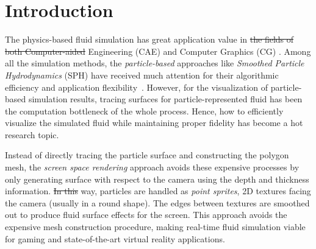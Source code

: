 \documentclass[times,twocolumn,final]{elsarticle}
\providecommand{\DIFaddtex}[1]{{\protect\color{blue}\uwave{#1}}} %
\providecommand{\DIFdeltex}[1]{{\protect\color{red}\sout{#1}}}                      %
\providecommand{\DIFaddbegin}{} %
\providecommand{\DIFaddend}{} %
\providecommand{\DIFdelbegin}{} %
\providecommand{\DIFdelend}{} %
\providecommand{\DIFadd}[1]{\texorpdfstring{\DIFaddtex{#1}}{#1}} %
\providecommand{\DIFdel}[1]{\texorpdfstring{\DIFdeltex{#1}}{}} %
\begin{document}
\linenumbers

\section{Introduction}
\label{sec1}
\DIFaddbegin 


\DIFaddend The physics-based fluid simulation has great application value in \DIFdelbegin \DIFdel{the fields of both Computer-aided }\DIFdelend \DIFaddbegin \DIFadd{computer-aided }\DIFaddend Engineering (CAE) and Computer Graphics (CG) \DIFaddbegin \DIFadd{fields}\DIFaddend .
Among all the simulation methods, the \emph{particle-based} approaches like \emph{Smoothed Particle Hydrodynamics} (SPH) have received much attention for their algorithmic efficiency and application flexibility~\cite{Ihmsen14}. 
However, for the visualization of particle-based simulation results, tracing surfaces for particle-represented fluid has been the computation bottleneck of the whole process. Hence, how to efficiently visualize the simulated fluid while maintaining proper fidelity has become a hot research topic.

Instead of directly tracing the particle surface and constructing the polygon mesh, the \emph{screen space rendering} approach avoids these expensive processes by only generating \DIFaddbegin \DIFadd{the }\DIFaddend surface with respect to the camera using the depth and thickness information. \DIFdelbegin \DIFdel{In this }\DIFdelend \DIFaddbegin \DIFadd{This }\DIFaddend way, particles are handled as \emph{point sprites}, 2D textures facing the camera (usually in a round shape). The edges between textures are smoothed out to produce fluid surface effects for the screen\cite{ref:ref2}. This approach avoids the expensive mesh construction procedure, making real-time fluid simulation viable for gaming and state-of-the-art virtual reality applications\cite{ref:ref3}. 
\end{document}
